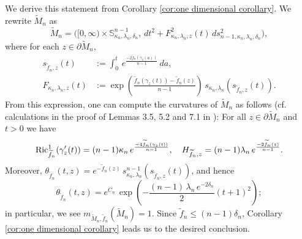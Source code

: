 \begin{ex}
We derive this statement from Corollary \ref{cor:one dimensional corollary}.
We rewrite $\widetilde{M}_{n}$ as
\begin{equation*}
\widetilde{M}_{n}=\bigl([0,\infty) \times \mathbb{S}^{n-1}_{\kappa_{n},\lambda_{n},\delta_{n}},\, dt^{2}+F^{2}_{\kappa_{n},\lambda_{n},z}(t)\,ds^{2}_{n-1,\kappa_{n},\lambda_{n},\delta_{n}}\bigl),
\end{equation*}
where for each $z\in \partial \widetilde{M}_{n}$,
\begin{align*}
s_{\widetilde{f}_{n},z}(t)&:=\int^{t}_{0}\,  e^{\frac{-2\widetilde{f}_{n}(\gamma_{z}(a))}{n-1}}\,da,\\
F_{\kappa_{n},\lambda_{n},z}(t)&:= \exp \left(  \frac{\widetilde{f}_{n}(\gamma_{z}(t))-\widetilde{f}_{n}(z)}{n-1}  \right)\,s_{\kappa_{n},\lambda_{n}}(s_{\widetilde{f}_{n},z}(t)).
\end{align*}
From this expression,
one can compute the curvatures of $\widetilde{M}_{n}$ as follows (cf. calculations in the proof of Lemmas 3.5, 5.2 and 7.1 in \cite{S2}):
For all $z\in \partial \widetilde{M}_{n}$ and $t>0$
we have
\begin{equation*}
\operatorname{Ric}^{1}_{\widetilde{f}_{n}}(\gamma'_{z}(t))=(n-1)\kappa_{n}\,e^{\frac{-4\widetilde{f}_{n}(\gamma_{z}(t))}{n-1}},\quad H_{\widetilde{f}_{n},z}=(n-1)\lambda_{n}\,e^{\frac{-2\widetilde{f}_{n}(z)}{n-1}}.
\end{equation*}
Moreover,
$\theta_{\widetilde{f}_{n}}(t,z)=e^{-\widetilde{f}_{n}(z)}\,s^{n-1}_{\kappa_{n},\lambda_{n}}(s_{\widetilde{f}_{n},z}(t))$,
and hence
\begin{equation*}
\theta_{\widetilde{f}_{n}}(t,z)=e^{C_{n}}\,\exp \left(-\frac{(n-1)\,\lambda_{n}\,e^{-2\delta_{n}}}{2}(t+1)^{2}\right);
\end{equation*}
in particular,
we see $m_{\widetilde{M}_{n},\widetilde{f}_{n}}(\widetilde{M}_{n})=1$.
Since $\widetilde{f}_{n}\leq (n-1)\delta_{n}$,
Corollary \ref{cor:one dimensional corollary} leads us to the desired conclusion.
\end{ex}


